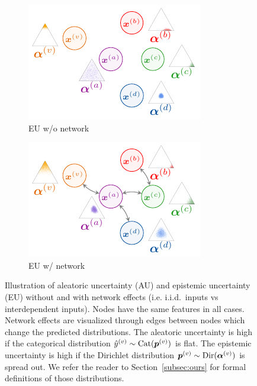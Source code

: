 \begin{figure}
\begin{subfigure}[t]{0.24\textwidth}
		\includegraphics[width=\textwidth]{sections/009_neurips2021/resources/no-network-epistemic.pdf}
		\caption{EU w/o network}
		\label{subfig:eu_without_network}
	\end{subfigure}
	\begin{subfigure}[t]{0.24\textwidth}
	    \centering
		\includegraphics[width=\textwidth]{sections/009_neurips2021/resources/network-epistemic.pdf}
		\caption{EU w/ network}
		\label{subfig:eu_with_network}
	\end{subfigure}
	\caption{Illustration of aleatoric uncertainty (AU) and epistemic uncertainty (EU) without and with network effects (i.e. i.i.d.\ inputs vs interdependent inputs). Nodes have the same features in all cases. Network effects are visualized through edges between nodes which change the predicted distributions. The aleatoric uncertainty is high if the categorical distribution $\hat{y} ^{(v)} \sim \operatorname{Cat}(\bm{p}^{(v)})$ is flat. The epistemic uncertainty is high if the Dirichlet distribution $\bm{p}^{(v)} \sim \operatorname{Dir}(\bm{\alpha}^{(v)})$ is spread out. We refer the reader to Section~\ref{subsec:ours} for formal definitions of those distributions.}
    \label{fig:uncertainty_types_small}
\end{figure}
